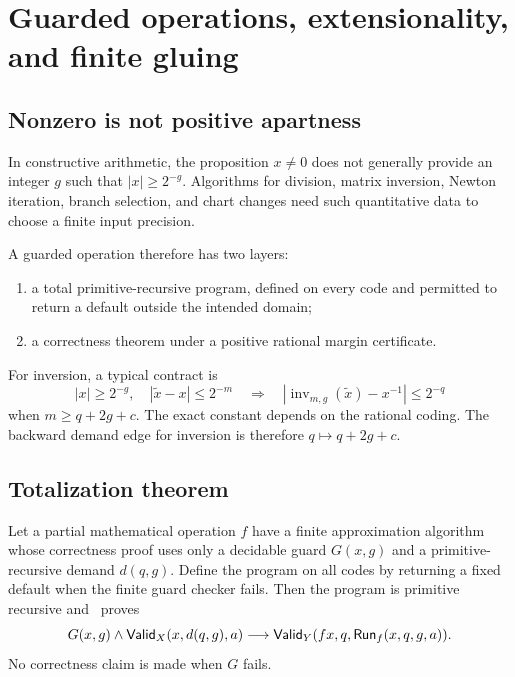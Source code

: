 \section{Guarded operations, extensionality, and finite gluing}\label{sec:guarded}

\subsection{Nonzero is not positive apartness}

In constructive arithmetic, the proposition \(x\ne0\) does not generally provide an integer \(g\) such that \(|x|\ge2^{-g}\).  Algorithms for division, matrix inversion, Newton iteration, branch selection, and chart changes need such quantitative data to choose a finite input precision.

A guarded operation therefore has two layers:
\begin{enumerate}[label=(\arabic*)]
  \item a total primitive-recursive program, defined on every code and permitted to return a default outside the intended domain;
  \item a correctness theorem under a positive rational margin certificate.
\end{enumerate}
For inversion, a typical contract is
\[
 |x|\ge2^{-g},\quad |\tilde x-x|\le2^{-m}
 \quad\Longrightarrow\quad
 \left|\operatorname{inv}_{m,g}(\tilde x)-x^{-1}\right|\le2^{-q}
\]
when \(m\ge q+2g+c\).  The exact constant depends on the rational coding.  The backward demand edge for inversion is therefore \(q\mapsto q+2g+c\).

\subsection{Totalization theorem}

\begin{theorem}\label{thm:totalization}
Let a partial mathematical operation \(f\) have a finite approximation algorithm whose correctness proof uses only a decidable guard \(G(x,g)\) and a primitive-recursive demand \(d(q,g)\).  Define the program on all codes by returning a fixed default when the finite guard checker fails.  Then the program is primitive recursive and \iPRA\ proves
\[
 G(x,g)\wedge\mathsf{Valid}_X(x,d(q,g),a)
 \longrightarrow
 \mathsf{Valid}_Y(fx,q,\mathsf{Run}_f(x,q,g,a)).
\]
No correctness claim is made when \(G\) fails.
\end{theorem}

